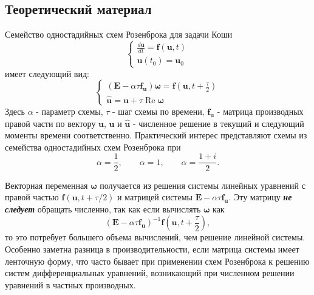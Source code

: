 \chapter{}

\section{Теоретический материал}
Семейство одностадийных схем Розенброка для задачи Коши
\begin{equation} \label{c3eq1}
	\begin{cases}
		\displaystyle \frac{d\mathbf{u}}{dt} = \mathbf{f} \left( \mathbf{u}, t \right) \\
		\mathbf{u}(t_0) = \mathbf{u}_0
	\end{cases}
\end{equation}
имеет следующий вид:
\begin{equation} \label{c3eq2}
	\begin{cases}
		\displaystyle \left( \mathbf{E} - \alpha \tau \mathbf{f_u} \right) \boldsymbol{\omega}= \mathbf{f} \left( \mathbf{u}, t + \frac{\tau}{2} \right) \\
		\mathbf{\hat{u}} = \mathbf{u} + \tau \operatorname{Re} \boldsymbol{\omega}
	\end{cases}
\end{equation}
Здесь $\alpha$ - параметр схемы, $\tau$ - шаг схемы по времени, $\mathbf{f_u}$ - матрица производных правой части по вектору $\mathbf{u}$, $\mathbf{u}$ и $\mathbf{\hat{u}}$ - численное решение в текущий и следующий моменты времени соответственно. Практический интерес представляют схемы из семейства одностадийных схем Розенброка при  
\begin{equation} \nonumber
\alpha = \frac{1}{2},
\qquad
\alpha = 1,
\qquad
\alpha = \frac{1+i}{2}.
\end{equation}

Векторная переменная $\boldsymbol{\omega}$ получается из решения системы линейных уравнений с правой частью $\mathbf{f} \left( \mathbf{u}, t + \tau/2 \right)$ и матрицей системы $\mathbf{E} - \alpha \tau \mathbf{f_u}$. Эту матрицу \textbf{\textit{не следует}} обращать численно, так как если вычислять  $\boldsymbol{\omega}$ как 
\begin{equation} \nonumber
	\left( \mathbf{E} - \alpha \tau \mathbf{f_u} \right)^{-1} \mathbf{f} \left( \mathbf{u}, t + \frac{\tau}{2} \right),
\end{equation}
то это потребует большего объема вычислений, чем решение линейной системы. Особенно заметна разница в производительности, если матрица системы имеет ленточную форму, что часто бывает при применении схем Розенброка к решению систем дифференциальных уравнений, возникающий при численном решении уравнений в частных производных.

